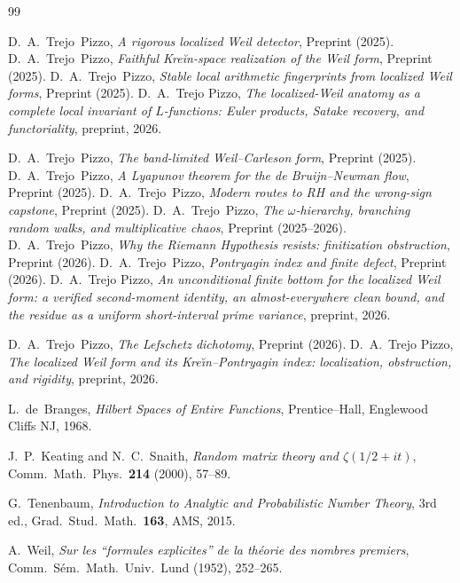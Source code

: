 \documentclass[11pt]{amsart}
\theoremstyle{definition}
\theoremstyle{remark}
\newcommand{\om}{\omega}
\begin{document}
\begin{thebibliography}{99}

D.~A.\ Trejo~Pizzo,
\emph{A rigorous localized Weil detector},
Preprint (2025).
D.~A.\ Trejo~Pizzo,
\emph{Faithful Kreĭn-space realization of the Weil form},
Preprint (2025).
D.~A.\ Trejo~Pizzo,
\emph{Stable local arithmetic fingerprints from localized Weil forms},
Preprint (2025).
 D.~A.~Trejo Pizzo, \emph{The localized-Weil anatomy as a complete local invariant of $L$-functions: Euler products, Satake recovery, and functoriality}, preprint, 2026.

D.~A.\ Trejo~Pizzo,
\emph{The band-limited Weil--Carleson form},
Preprint (2025).
D.~A.\ Trejo~Pizzo,
\emph{A Lyapunov theorem for the de Bruijn--Newman flow},
Preprint (2025).
D.~A.\ Trejo~Pizzo,
\emph{Modern routes to RH and the wrong-sign capstone},
Preprint (2025).
D.~A.\ Trejo~Pizzo,
\emph{The $\om$-hierarchy, branching random walks, and multiplicative chaos},
Preprint (2025--2026).
D.~A.\ Trejo~Pizzo,
\emph{Why the Riemann Hypothesis resists: finitization obstruction},
Preprint (2026).
D.~A.\ Trejo~Pizzo,
\emph{Pontryagin index and finite defect},
Preprint (2026).
 D.~A.~Trejo Pizzo, \emph{An unconditional finite bottom for the localized Weil form: a verified second-moment identity, an almost-everywhere clean bound, and the residue as a uniform short-interval prime variance}, preprint, 2026.

D.~A.\ Trejo~Pizzo,
\emph{The Lefschetz dichotomy},
Preprint (2026).
 D.~A.~Trejo Pizzo, \emph{The localized Weil form and its Kre\u\i n--Pontryagin index: localization, obstruction, and rigidity}, preprint, 2026.


L.~de~Branges,
\emph{Hilbert Spaces of Entire Functions},
Prentice--Hall, Englewood Cliffs NJ, 1968.

J.~P.\ Keating and N.~C.\ Snaith,
\emph{Random matrix theory and $\zeta(1/2+it)$},
Comm.\ Math.\ Phys.\ \textbf{214} (2000), 57--89.

G.~Tenenbaum,
\emph{Introduction to Analytic and Probabilistic Number Theory},
3rd ed., Grad.\ Stud.\ Math.\ \textbf{163}, AMS, 2015.

A.~Weil,
\emph{Sur les ``formules explicites'' de la th\'eorie des nombres premiers},
Comm.\ S\'em.\ Math.\ Univ.\ Lund (1952), 252--265.

\end{thebibliography}
\end{document}
